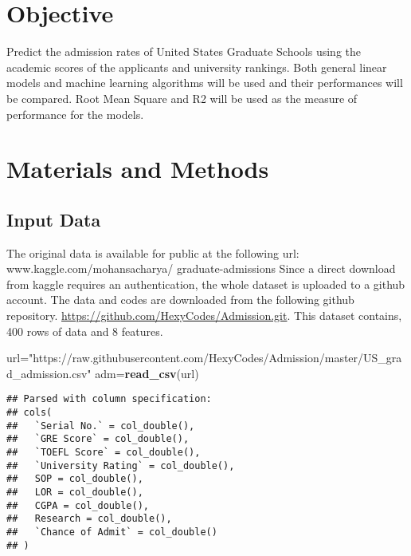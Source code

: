 \documentclass[11pt,]{article}
\newenvironment{Shaded}{\begin{snugshade}}{\end{snugshade}}
\newcommand{\KeywordTok}[1]{\textcolor[rgb]{0.13,0.29,0.53}{\textbf{#1}}}
\newcommand{\NormalTok}[1]{#1}
\newcommand{\StringTok}[1]{\textcolor[rgb]{0.31,0.60,0.02}{#1}}
\begin{document}
\vskip -8.5pt

{
\hypersetup{linkcolor=black}
\setcounter{tocdepth}{2}
\tableofcontents
}


\noindent  

\hypertarget{objective}{%
\section{Objective}\label{objective}}

Predict the admission rates of United States Graduate Schools using the
academic scores of the applicants and university rankings. Both general
linear models and machine learning algorithms will be used and their
performances will be compared. Root Mean Square and R2 will be used as
the measure of performance for the models.

\hypertarget{materials-and-methods}{%
\section{Materials and Methods}\label{materials-and-methods}}

\hypertarget{input-data}{%
\subsection{Input Data}\label{input-data}}

The original data is available for public at the following url:
www.kaggle.com/mohansacharya/ graduate-admissions Since a direct
download from kaggle requires an authentication, the whole dataset is
uploaded to a github account. The data and codes are downloaded from the
following github repository.
\url{https://github.com/HexyCodes/Admission.git}. This dataset contains,
400 rows of data and 8 features.

\begin{Shaded}
\begin{Highlighting}[]
\NormalTok{url=}\StringTok{"https://raw.githubusercontent.com/HexyCodes/Admission/master/US_grad_admission.csv"}
\NormalTok{adm=}\KeywordTok{read_csv}\NormalTok{(url)}
\end{Highlighting}
\end{Shaded}

\begin{verbatim}
## Parsed with column specification:
## cols(
##   `Serial No.` = col_double(),
##   `GRE Score` = col_double(),
##   `TOEFL Score` = col_double(),
##   `University Rating` = col_double(),
##   SOP = col_double(),
##   LOR = col_double(),
##   CGPA = col_double(),
##   Research = col_double(),
##   `Chance of Admit` = col_double()
## )
\end{verbatim}
\end{document}
